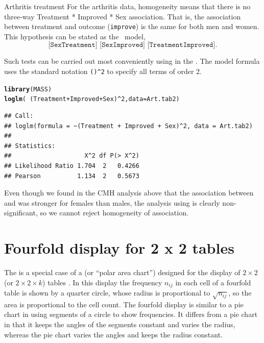 \documentclass[11pt]{book}\usepackage[]{graphicx}\usepackage[]{color}
\makeatletter
\newcommand{\hlnum}[1]{\textcolor[rgb]{0.686,0.059,0.569}{#1}}%
\newcommand{\hlopt}[1]{\textcolor[rgb]{0,0,0}{#1}}%
\newcommand{\hlstd}[1]{\textcolor[rgb]{0.345,0.345,0.345}{#1}}%
\newcommand{\hlkwc}[1]{\textcolor[rgb]{0.333,0.667,0.333}{#1}}%
\newcommand{\hlkwd}[1]{\textcolor[rgb]{0.737,0.353,0.396}{\textbf{#1}}}%
\newenvironment{kframe}{%
 \def\at@end@of@kframe{}%
 \ifinner\ifhmode%
  \def\at@end@of@kframe{\end{minipage}}%
  \begin{minipage}{\columnwidth}%
 \fi\fi%
 \def\FrameCommand##1{\hskip\@totalleftmargin \hskip-\fboxsep
 \colorbox{shadecolor}{##1}\hskip-\fboxsep
     \hskip-\linewidth \hskip-\@totalleftmargin \hskip\columnwidth}%
 \MakeFramed {\advance\hsize-\width
   \@totalleftmargin\z@ \linewidth\hsize
   \@setminipage}}%
 {\par\unskip\endMakeFramed%
 \at@end@of@kframe}
\newenvironment{knitrout}{}{} %
\renewenvironment{knitrout}{\small\renewcommand{\baselinestretch}{.85}}{} %
\makeatother
\begin{document}
\begin{Example}[arthrit4]{Arthritis treatment}
For the arthritis data, homogeneity means that there is no three-way
Treatment * Improved * Sex association.  That is, the association
between treatment and outcome (\texttt{improve})
is the same for both men and women.
This hypothesis can be stated
as the \loglin\ model,
\begin{equation}\label{eq:STO2}
 \texttt{[SexTreatment] [SexImproved] [TreatmentImproved]}
 \period
\end{equation}

Such tests can be carried out most conveniently using
 in the .  The model formula
uses the standard \R notation \verb|()^2| to specify all
terms of order 2.
\begin{knitrout}
\color{fgcolor}\begin{kframe}
\begin{alltt}
\hlkwd{library}\hlstd{(MASS)}
\hlkwd{loglm}\hlstd{(}\hlopt{~} \hlstd{(Treatment} \hlopt{+} \hlstd{Improved} \hlopt{+} \hlstd{Sex)}\hlopt{^}\hlnum{2}\hlstd{,} \hlkwc{data}\hlstd{=Art.tab2)}
\end{alltt}
\begin{verbatim}
## Call:
## loglm(formula = ~(Treatment + Improved + Sex)^2, data = Art.tab2)
## 
## Statistics:
##                    X^2 df P(> X^2)
## Likelihood Ratio 1.704  2   0.4266
## Pearson          1.134  2   0.5673
\end{verbatim}
\end{kframe}
\end{knitrout}

Even though we found in the CMH analysis above that the
association between  and 
was stronger for females than males, the analysis using
 is clearly non-significant, so we cannot
reject homogeneity of association.
\end{Example}


\section{Fourfold display for 2 x 2 tables}\label{sec:twoway-fourfold}

The  is a special case of a
 (or ``polar area chart'')
designed for the display of $2 \times 2$ (or $2 \times 2 \times k$)
tables
\citep{Fienberg:75,Friendly:94b,Friendly:94c}.
In this display the frequency
\(n_{ij}\) in each cell of a fourfold table is shown by a quarter
circle, whose radius is proportional to \(\sqrt { n_{ij} }\), so the
area is proportional to the cell count.
The fourfold display
is similar to a pie chart in using segments of
a circle to show frequencies.  It
differs from a pie chart in that it keeps the
angles of the segments constant and varies the radius,
whereas the pie chart varies the angles and keeps the radius constant.
\end{document}
